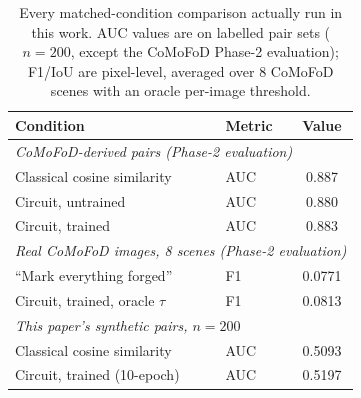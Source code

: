 \documentclass[conference]{IEEEtran}
\begin{document}
\begin{table}[t]
\centering
\caption{Every matched-condition comparison actually run in this work. AUC values are on labelled pair sets ($n = 200$, except the CoMoFoD Phase-2 evaluation); F1/IoU are pixel-level, averaged over 8 CoMoFoD scenes with an oracle per-image threshold.}
\label{tab:matched}
\begin{tabular}{llc}
\toprule
\textbf{Condition} & \textbf{Metric} & \textbf{Value}\\
\midrule
\multicolumn{3}{l}{\emph{CoMoFoD-derived pairs (Phase-2 evaluation)}}\\
Classical cosine similarity & AUC & 0.887\\
Circuit, untrained & AUC & 0.880\\
Circuit, trained & AUC & 0.883\\
\midrule
\multicolumn{3}{l}{\emph{Real CoMoFoD images, 8 scenes (Phase-2 evaluation)}}\\
``Mark everything forged'' & F1 & 0.0771\\
Circuit, trained, oracle $\tau$ & F1 & 0.0813\\
\midrule
\multicolumn{3}{l}{\emph{This paper's synthetic pairs, $n = 200$}}\\
Classical cosine similarity & AUC & 0.5093\\
Circuit, trained (10-epoch) & AUC & 0.5197\\
\bottomrule
\end{tabular}
\end{table}
\end{document}
